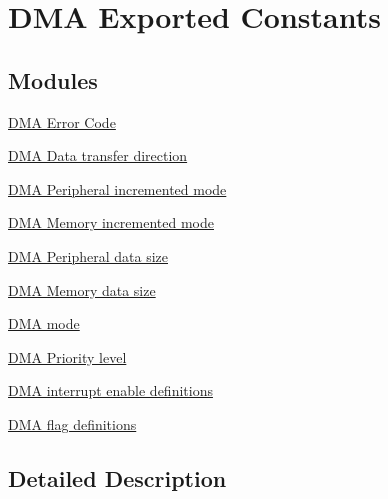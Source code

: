 \hypertarget{group___d_m_a___exported___constants}{\section{D\-M\-A Exported Constants}
\label{group___d_m_a___exported___constants}
}
\subsection*{Modules}
\begin{DoxyCompactItemize}
\item 
\hyperlink{group___d_m_a___error___code}{D\-M\-A Error Code}
\item 
\hyperlink{group___d_m_a___data__transfer__direction}{D\-M\-A Data transfer direction}
\item 
\hyperlink{group___d_m_a___peripheral__incremented__mode}{D\-M\-A Peripheral incremented mode}
\item 
\hyperlink{group___d_m_a___memory__incremented__mode}{D\-M\-A Memory incremented mode}
\item 
\hyperlink{group___d_m_a___peripheral__data__size}{D\-M\-A Peripheral data size}
\item 
\hyperlink{group___d_m_a___memory__data__size}{D\-M\-A Memory data size}
\item 
\hyperlink{group___d_m_a__mode}{D\-M\-A mode}
\item 
\hyperlink{group___d_m_a___priority__level}{D\-M\-A Priority level}
\item 
\hyperlink{group___d_m_a__interrupt__enable__definitions}{D\-M\-A interrupt enable definitions}
\item 
\hyperlink{group___d_m_a__flag__definitions}{D\-M\-A flag definitions}
\end{DoxyCompactItemize}


\subsection{Detailed Description}
